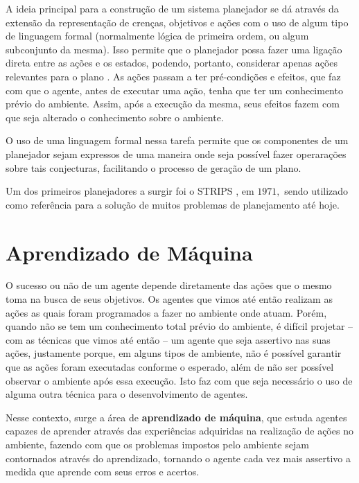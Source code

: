 A ideia principal para a construção de um sistema planejador se dá através da
extensão da representação de crenças, objetivos e ações com o uso de algum tipo
de linguagem formal (normalmente lógica de primeira ordem, ou algum subconjunto
da mesma). Isso permite que o planejador possa fazer uma ligação direta entre as
ações e os estados, podendo, portanto, considerar apenas ações relevantes para o
plano \cite{Russell:1995:AIM:193191}. As ações passam a ter pré-condições e
efeitos, que faz com que o agente, antes de executar uma ação, tenha que ter um
conhecimento prévio do ambiente. Assim, após a execução da mesma, seus efeitos
fazem com que seja alterado o conhecimento sobre o ambiente.

O uso de uma linguagem formal nessa tarefa permite que os componentes de um
planejador sejam expressos de uma maneira onde seja possível fazer operarações
sobre tais conjecturas, facilitando o processo de geração de um plano.

Um dos primeiros planejadores a surgir foi o STRIPS
\cite{Fikes:1971:SNA:1622876.1622939}, em $1971,$ sendo utilizado como
referência para a solução de muitos problemas de planejamento até hoje.

\section{Aprendizado de Máquina}

O sucesso ou não de um agente depende diretamente das ações que o mesmo toma na
busca de seus objetivos. Os agentes que vimos até então realizam as ações as
quais foram programados a fazer no ambiente onde atuam. Porém, quando não se
tem um conhecimento total prévio do ambiente, é difícil projetar -- com as
técnicas que vimos até então -- um agente que seja assertivo nas suas ações,
justamente porque, em alguns tipos de ambiente, não é possível garantir que as
ações foram executadas conforme o esperado, além de não ser possível observar
o ambiente após essa execução. Isto faz com que seja necessário o uso de alguma
outra técnica para o desenvolvimento de agentes.

Nesse contexto, surge a área de \textbf{aprendizado de máquina}, que estuda
agentes capazes de aprender através das experiências adquiridas na realização de
ações no ambiente, fazendo com que os problemas impostos pelo ambiente sejam
contornados através do aprendizado, tornando o agente cada vez mais assertivo a
medida que aprende com seus erros e acertos.

